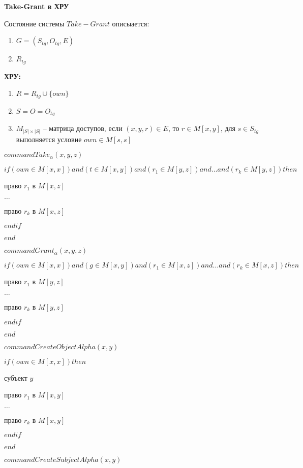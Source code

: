 \textbf{Take-Grant в ХРУ}

Состояние системы $Take-Grant$ описыается:
\begin{enumerate}
	\item $G=(S_{tg}, O_{tg}, E)$
	\item $R_{tg}$
\end{enumerate}

\textbf{ХРУ:}
\begin{enumerate}
	\item $R = R_{tg} \cup \{own\}$
	\item $S = O = O_{tg}$
	\item $M_{|S| \times |S|}$ -- матрица доступов, если $(x,y,r) \in E$, то $r \in M[x,y]$, для $s \in S_{tg}$ выполняется условие $own \in M[s,s]$
\end{enumerate}

		$command  Take_{\alpha}(x,y,z)$

		$if (own \in M[x,x]) and (t \in M[x,y])and (r_1 \in M[y,z])and  \ldots and (r_k \in M[y,z]) then $

		 право $r_1$ в $M[x,z]$

		$\ldots$

		 право $r_k$ в $M[x,z]$

		$endif$

		$end$



		$command  Grant_{\alpha}(x,y,z)$

		$if (own \in M[x,x]) and (g \in M[x,y])and (r_1 \in M[x,z])and  \ldots and (r_k \in M[x,z]) then $

		 право $r_1$ в $M[y,z]$

		$\ldots$

		 право $r_k$ в $M[y,z]$

		$endif$

		$end$



		$command  CreateObjectAlpha(x,y)$

		$if (own \in M[x,x]) then $

		 субъект $y$

		 право $r_1$ в $M[x,y]$

		$\ldots$

		 право $r_k$ в $M[x,y]$

		$endif$

		$end$



		$command  CreateSubjectAlpha(x,y)$

